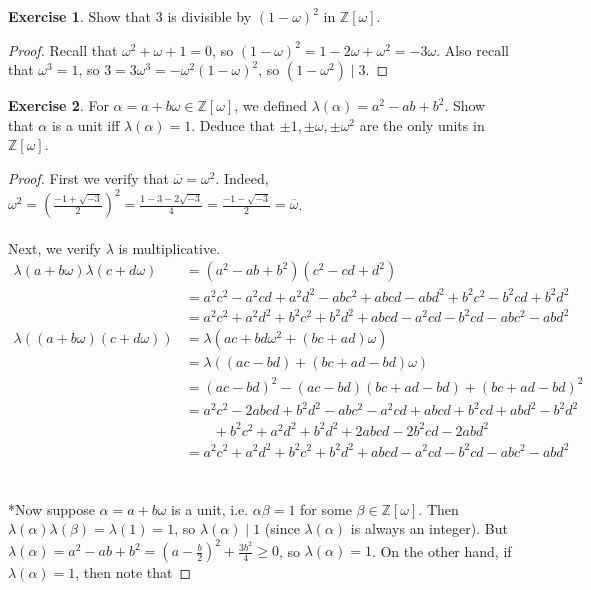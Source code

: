 \documentclass{article}
\theoremstyle{definition}
\newtheorem{exercise}{Exercise}
\begin{document}
\begin{exercise}
Show that $3$ is divisible by $(1 - \omega)^2$ in $\mathbb{Z}[\omega]$.
\end{exercise}
\begin{proof}
Recall that $\omega^2 + \omega + 1 = 0$, so $(1 - \omega)^2 = 1 - 2 \omega + \omega^2 = - 3 \omega$. Also recall that $\omega^3 = 1$, so $3 = 3 \omega^3 = - \omega^2 (1 - \omega)^2$, so $(1 - \omega^2) \mid 3$.
\end{proof}
\begin{exercise}
For $\alpha = a + b \omega \in \mathbb{Z}[\omega]$, we defined $\lambda(\alpha) = a^2 - ab + b^2$. Show that $\alpha$ is a unit iff $\lambda(\alpha) = 1$. Deduce that $\pm 1, \pm \omega, \pm \omega^2$ are the only units in $\mathbb{Z}[\omega]$.
\end{exercise}
\begin{proof}
First we verify that $\overline{\omega} = \omega^2$. Indeed, $\omega^2 = \left( \frac{-1 + \sqrt{-3}}{2} \right)^2 = \frac{1 - 3 - 2 \sqrt{-3}}{4} = \frac{-1 - \sqrt{-3}}{2} = \overline{\omega}$.
\\
\\
Next, we verify $\lambda$ is multiplicative.
\begin{align*}
\lambda(a + b \omega) \lambda(c + d \omega) & = (a^2 - ab + b^2) (c^2 - cd + d^2) \\
& = a^2 c^2 - a^2 cd + a^2 d^2 - ab c^2 + abcd - abd^2 + b^2 c^2 - b^2 cd + b^2 d^2 \\
& = a^2 c^2 + a^2 d^2 + b^2 c^2 + b^2 d^2 + abcd - a^2 cd - b^2 cd - abc^2 - abd^2 \\
\lambda((a + b \omega)(c + d \omega)) & = \lambda(ac + bd \omega^2 + (bc + ad) \omega) \\
& = \lambda((ac - bd) + (bc + ad - bd) \omega) \\
& = (ac - bd)^2 - (ac - bd) (bc + ad - bd) + (bc + ad - bd)^2 \\
& = a^2 c^2 - 2abcd + b^2 d^2 - abc^2 - a^2 cd + abcd + b^2 cd + abd^2 - b^2 d^2 \\
& \qquad + b^2 c^2 + a^2 d^2 + b^2 d^2 + 2abcd - 2 b^2 cd - 2 ab d^2 \\
& = a^2 c^2 + a^2 d^2 + b^2 c^2 + b^2 d^2 + abcd - a^2 cd - b^2 cd - abc^2 - abd^2
\end{align*}
\\
\\
*Now suppose $\alpha = a + b \omega$ is a unit, i.e. $\alpha \beta = 1$ for some $\beta \in \mathbb{Z}[\omega]$. Then $\lambda(\alpha) \lambda(\beta) = \lambda(1) = 1$, so $\lambda(\alpha) \mid 1$ (since $\lambda(\alpha)$ is always an integer). But $\lambda(\alpha) = a^2 - ab + b^2 = \left( a - \frac{b}{2} \right)^2 + \frac{3b^2}{4} \geq 0$, so $\lambda(\alpha) = 1$. On the other hand, if $\lambda(\alpha) = 1$, then note that

\end{proof}
\end{document}
